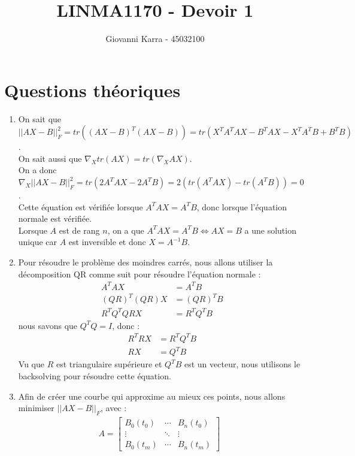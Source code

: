 \documentclass[11pt]{article}
\title{LINMA1170 - Devoir 1}
\author{Giovanni Karra - 45032100}
\begin{document}
\maketitle

\section{Questions théoriques}
\begin{enumerate}
    \item On sait que $||AX - B||_F^2 = tr((AX - B)^T(AX - B)) = tr(X^TA^TAX - B^TAX - X^TA^TB + B^TB)$.\\
    On sait aussi que $\nabla_X tr(AX) = tr(\nabla_X AX)$.\\
    On a donc $\nabla_X||AX - B||_F^2 = tr(2A^TAX-2A^TB) = 2(tr(A^TAX)-tr(A^TB)) = 0$.\\
    Cette équation est vérifiée lorsque $A^TAX = A^TB$, donc lorsque l'équation normale est vérifiée.\\
    Lorsque $A$ est de rang $n$, on a que $A^TAX = A^TB \Leftrightarrow AX = B$ a une solution unique car $A$ est inversible et donc $X = A^{-1}B$.
    \item Pour résoudre le problème des moindres carrés, nous allons utiliser la décomposition QR comme suit pour résoudre l'équation normale :
    \begin{align}
        A^TAX &= A^TB\\
        (QR)^T(QR)X &= (QR)^TB\\
        R^TQ^TQRX &= R^TQ^TB
    \end{align}
    nous savons que $Q^TQ = I$, donc :
    \begin{align}
        R^TRX &= R^TQ^TB\\
        RX &= Q^TB
    \end{align}
    Vu que $R$ est triangulaire supérieure et $Q^TB$ est un vecteur, nous utilisons le backsolving pour résoudre cette équation.
    \item Afin de créer une courbe qui approxime au mieux ces points, nous allons minimiser $||AX - B||_F$, avec :\\
    \begin{gather}
        A = \left[\begin{array}{ccc}
            B_0(t_0) & \cdots & B_n(t_0)\\
            \vdots & \ddots & \vdots\\
            B_0(t_m) & \cdots & B_n(t_m)
        \end{array}\right]~~~

\end{gather}
\end{enumerate}
\end{document}
